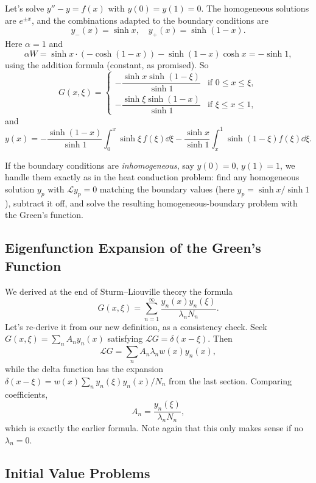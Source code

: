 \begin{example}
    Let's solve $y'' - y = f(x)$ with $y(0) = y(1) = 0$.
    The homogeneous solutions are $e^{\pm x}$, and the combinations adapted to the boundary conditions are
    $$
    y_-(x) = \sinh x, \quad y_+(x) = \sinh (1 - x).
    $$
    Here $\alpha = 1$ and
    $$
    \alpha W = \sinh x \cdot (-\cosh(1 - x)) - \sinh(1 - x) \cosh x = -\sinh 1,
    $$
    using the addition formula (constant, as promised). So
    $$
    G(x, \xi) = \begin{cases}
        -\dfrac{\sinh x \sinh (1 - \xi)}{\sinh 1} &\mbox{if } 0 \leq x \leq \xi, \\[2ex]
        -\dfrac{\sinh \xi \sinh(1 - x)}{\sinh 1} &\mbox{if } \xi \leq x \leq 1,
    \end{cases}
    $$
    and
    $$
    y(x) = -\frac{\sinh(1 - x)}{\sinh 1}\int_0^x \sinh \xi \, f(\xi) \dd \xi - \frac{\sinh x}{\sinh 1} \int_x^1 \sinh(1 - \xi) f(\xi) \dd \xi.
    $$
\end{example}

If the boundary conditions are \emph{inhomogeneous}, say $y(0) = 0$, $y(1) = 1$, we handle them exactly as in the heat conduction problem: find any homogeneous solution $y_p$ with $\mathcal{L}y_p = 0$ matching the boundary values (here $y_p = \sinh x/\sinh 1$), subtract it off, and solve the resulting homogeneous-boundary problem with the Green's function.

\subsection{Eigenfunction Expansion of the Green's Function}

We derived at the end of Sturm--Liouville theory the formula
$$
G(x, \xi) = \sum_{n = 1}^{\infty} \frac{y_n(x) y_n(\xi)}{\lambda_n N_n}.
$$
Let's re-derive it from our new definition, as a consistency check. Seek $G(x, \xi) = \sum_n A_n y_n(x)$ satisfying $\mathcal{L}G = \delta(x - \xi)$. Then
$$
\mathcal{L}G = \sum_n A_n \lambda_n w(x) y_n(x),
$$
while the delta function has the expansion $\delta(x - \xi) = w(x)\sum_n y_n(\xi) y_n(x)/N_n$ from the last section. Comparing coefficients,
$$
A_n = \frac{y_n(\xi)}{\lambda_n N_n},
$$
which is exactly the earlier formula. Note again that this only makes sense if no $\lambda_n = 0$.

\subsection{Initial Value Problems}

